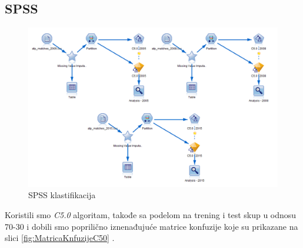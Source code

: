 \documentclass[a4paper]{article}
\begin{document}
\subsection{SPSS}

\begin{figure}[H]
	\begin{center}
		\includegraphics[scale=0.60]{Klasifikacija/C50/SPSS_C50_Surface.png}
	\end{center}
	\caption{SPSS klastifikacija}
	\label{fig:SPSS_CvoroviKlasifikacija}
\end{figure}

Koristili smo \textit{C5.0} algoritam, takođe sa podelom na trening i test skup u odnosu 70-30 i dobili smo poprilično iznenađujuće matrice konfuzije koje su prikazane na slici \ref{fig:MatricaKnfuzijeC50} .  
\end{document}
